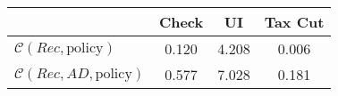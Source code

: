 \begin{tabular}{@{}lccc@{}} 
\toprule 
                          & Check      & UI    & Tax Cut    \\  \midrule 
$\mathcal{C}(Rec,\text{policy})$ & 0.120  & 4.208  & 0.006     \\ 
$\mathcal{C}(Rec, AD,\text{policy})$ & 0.577  & 7.028  & 0.181     \\ 
\end{tabular}  
